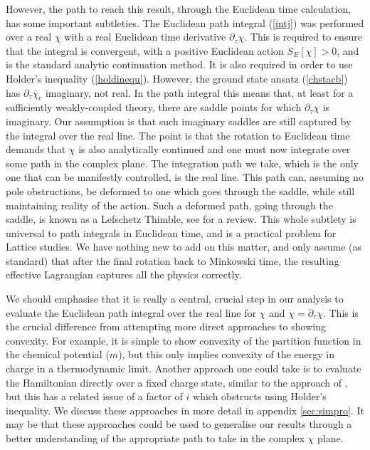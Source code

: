 \documentclass[11pt]{article}
\numberwithin{equation}{section}
\begin{document}
However, the path to reach this result, through the Euclidean time calculation, has some important subtleties. The Euclidean path integral (\ref{intj}) was performed over a real $\chi$ with a real Euclidean time derivative $\partial_{\tau}\chi$. This is required to ensure that the integral is convergent, with a positive Euclidean action $S_{E}[\chi]>0$, and is the standard analytic continuation method. It is also required in order to use Holder's inequality (\ref{holdinequ}). However, the ground state ansatz (\ref{chstacb}) has $\partial_{\tau}\overline{\chi}_c$ imaginary, not real. In the path integral this means that, at least for a sufficiently weakly-coupled theory, there are saddle points for which $\partial_{\tau}\chi$ is imaginary. Our assumption is that such imaginary saddles are still captured by the integral over the real line. The point is that the rotation to Euclidean time demands that $\chi$ is also analytically continued and one must now integrate over some path in the complex plane. The integration path we take, which is the only one that can be manifestly controlled, is the real line. This path can, assuming no pole obstructions, be deformed to one which goes through the saddle, while still maintaining reality of the action. Such a deformed path, going through the saddle, is known as a Lefschetz Thimble, see \cite{Scorzato:2015qts} for a review. This whole subtlety is universal to path integrals in Euclidean time, and is a practical problem for Lattice studies. We have nothing new to add on this matter, and only assume (as standard) that after the final rotation back to Minkowski time, the resulting effective Lagrangian captures all the physics correctly. 

We should emphasise that it is really a central, crucial step in our analysis to evaluate the Euclidean path integral over the real line for $\chi$ and $\dot{\chi}=\partial_{\tau}\chi$. This is the crucial difference from attempting more direct approaches to showing convexity. For example, it is simple to show convexity of the partition function in the chemical potential ($m$), but this only implies convexity of the energy in charge in a thermodynamic limit. Another approach one could take is to evaluate the Hamiltonian directly over a fixed charge state, similar to the approach of \cite{Badel:2019oxl}, but this has a related issue of a factor of $i$ which obstructs using Holder's inequality. We discuss these approaches in more detail in appendix \ref{sec:simpro}. It may be that these approaches could be used to generalise our results through a better understanding of the appropriate path to take in the complex $\chi$ plane.   
\end{document}
